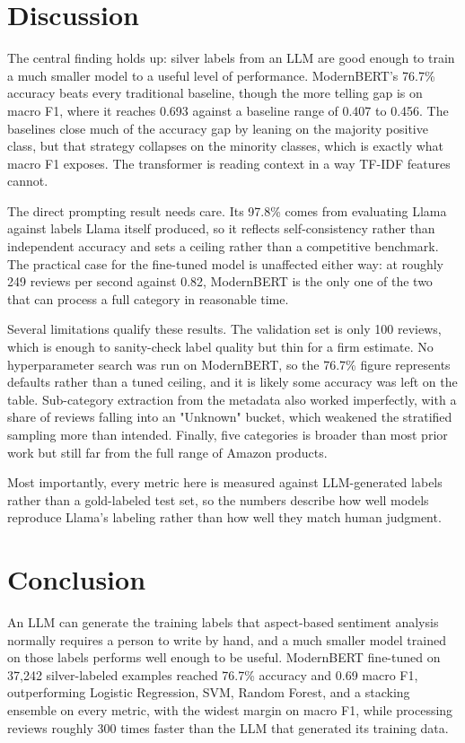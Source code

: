 \documentclass[sigconf]{acmart}
\begin{document}
\section{Discussion}
\label{sec:discussion}

The central finding holds up: silver labels from an LLM are good enough to train a much smaller model to a useful level of performance. ModernBERT's 76.7\% accuracy beats every traditional baseline, though the more telling gap is on macro F1, where it reaches 0.693 against a baseline range of 0.407 to 0.456. The baselines close much of the accuracy gap by leaning on the majority positive class, but that strategy collapses on the minority classes, which is exactly what macro F1 exposes. The transformer is reading context in a way TF-IDF features cannot.

The direct prompting result needs care. Its 97.8\% comes from evaluating Llama against labels Llama itself produced, so it reflects self-consistency rather than independent accuracy and sets a ceiling rather than a competitive benchmark. The practical case for the fine-tuned model is unaffected either way: at roughly 249 reviews per second against 0.82, ModernBERT is the only one of the two that can process a full category in reasonable time.

Several limitations qualify these results. The validation set is only 100 reviews, which is enough to sanity-check label quality but thin for a firm estimate. No hyperparameter search was run on ModernBERT, so the 76.7\% figure represents defaults rather than a tuned ceiling, and it is likely some accuracy was left on the table. Sub-category extraction from the metadata also worked imperfectly, with a share of reviews falling into an "Unknown" bucket, which weakened the stratified sampling more than intended. Finally, five categories is broader than most prior work but still far from the full range of Amazon products.

Most importantly, every metric here is measured against LLM-generated labels rather than a gold-labeled test set, so the numbers describe how well models reproduce Llama's labeling rather than how well they match human judgment.

\section{Conclusion}
An LLM can generate the training labels that aspect-based sentiment analysis normally requires a person to write by hand, and a much smaller model trained on those labels performs well enough to be useful. ModernBERT fine-tuned on 37,242 silver-labeled examples reached 76.7\% accuracy and 0.69 macro F1, outperforming Logistic Regression, SVM, Random Forest, and a stacking ensemble on every metric, with the widest margin on macro F1, while processing reviews roughly 300 times faster than the LLM that generated its training data.
\end{document}
